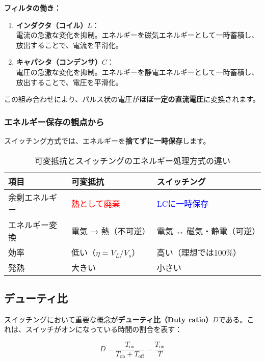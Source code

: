 \begin{screen}
\textbf{フィルタの働き：}

\begin{enumerate}
\item \textbf{インダクタ（コイル）$L$}：\\
電流の急激な変化を抑制。エネルギーを磁気エネルギーとして一時蓄積し、放出することで、電流を平滑化。

\item \textbf{キャパシタ（コンデンサ）$C$}：\\
電圧の急激な変化を抑制。エネルギーを静電エネルギーとして一時蓄積し、放出することで、電圧を平滑化。
\end{enumerate}

この組み合わせにより、パルス状の電圧が\textbf{ほぼ一定の直流電圧}に変換されます。
\end{screen}

\subsubsection{エネルギー保存の観点から}

スイッチング方式では、エネルギーを\textbf{捨てずに一時保存}します。

\begin{table}[H]
\centering
\caption{可変抵抗とスイッチングのエネルギー処理方式の違い}
\begin{tabular}{|l|l|l|}
\hline
\textbf{項目} & \textbf{可変抵抗} & \textbf{スイッチング} \\
\hline
\hline
余剰エネルギー & \textcolor{red}{熱として廃棄} & \textcolor{blue}{LCに一時保存} \\
\hline
エネルギー変換 & 電気 → 熱（不可逆） & 電気 ↔ 磁気・静電（可逆） \\
\hline
効率 & 低い（$\eta = V_L/V_s$） & 高い（理想では100\%） \\
\hline
発熱 & 大きい & 小さい \\
\hline
\end{tabular}
\end{table}

\subsection{デューティ比}

スイッチングにおいて重要な概念が\textbf{デューティ比（Duty ratio）}$D$である。これは、スイッチがオンになっている時間の割合を表す：

\begin{equation}
D = \frac{T_{\text{on}}}{T_{\text{on}} + T_{\text{off}}} = \frac{T_{\text{on}}}{T}
\end{equation}

